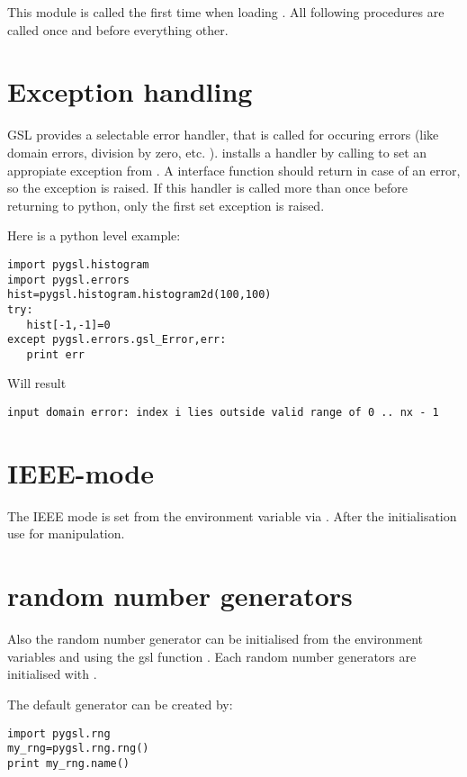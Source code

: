 
This module is called the first time when loading .
All following procedures are called once and before everything other.

\section{Exception handling}
 GSL provides a selectable error
handler, that is called for occuring errors (like domain errors, division by
zero, etc. ).   installs a handler by calling
 to set an appropiate exception from
.  A  interface function should return
 in case of an error, so the exception is raised.  If this handler
is called more than once before returning to python, only the first set
exception is raised.

Here is a python level example:
\begin{verbatim}
import pygsl.histogram
import pygsl.errors
hist=pygsl.histogram.histogram2d(100,100)
try:
   hist[-1,-1]=0
except pygsl.errors.gsl_Error,err:
   print err
\end{verbatim}
Will result
\begin{verbatim}
input domain error: index i lies outside valid range of 0 .. nx - 1
\end{verbatim}

\section{IEEE-mode}
The IEEE mode is set from the environment variable
  via .
After the initialisation use  for manipulation.

\section{random number generators}
Also the random number generator can be initialised from the environment variables
and  using the gsl function .
Each random number generators are initialised with .

The default generator can be created by:\nopagebreak
\begin{verbatim}
import pygsl.rng
my_rng=pygsl.rng.rng()
print my_rng.name()
\end{verbatim}
